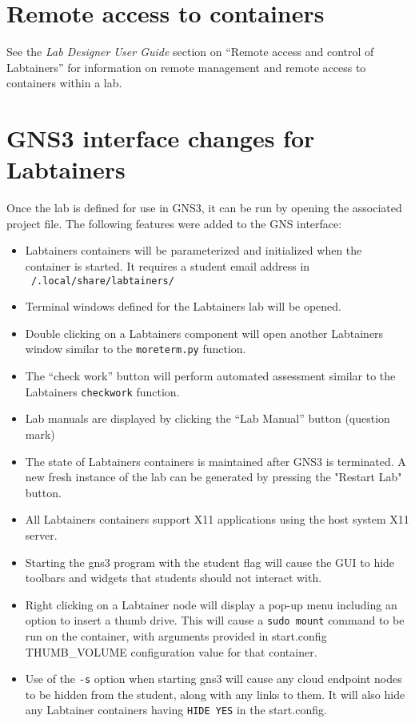 \documentclass[12pt]{article}
\begin{document}
\section{Remote access to containers}
See the \textit{Lab Designer User Guide} section on ``Remote access and control of Labtainers'' for information 
on remote management and remote access to containers within a lab.

\section{GNS3 interface changes for Labtainers}
Once the lab is defined for use in GNS3, it can be run by opening the associated project file.  The following features were added to the GNS interface:
\begin{itemize}
	\item Labtainers containers will be parameterized and initialized when the container is started.  It requires a student email address in
		{\tt ~/.local/share/labtainers/}
	\item Terminal windows defined for the Labtainers lab will be opened.
	\item Double clicking on a Labtainers component will open another Labtainers window similar to the {\tt moreterm.py} function.
	\item The ``check work'' button will perform automated assessment similar to the Labtainers {\tt checkwork} function.
	\item Lab manuals are displayed by clicking the ``Lab Manual'' button (question mark)
	\item The state of Labtainers containers is maintained after GNS3 is terminated.  A new fresh instance of the lab can be generated
		by pressing the "Restart Lab" button.
	\item All Labtainers containers support X11 applications using the host system X11 server.
	\item Starting the gns3 program with the \-\-student flag will cause the GUI to hide toolbars and widgets that students should not interact with.
        \item Right clicking on a Labtainer node will display a pop-up menu including an option to insert a thumb drive.  This will cause
              a {\tt sudo mount} command to be run on the container, with arguments provided in start.config THUMB\_VOLUME configuration
              value for that container.
        \item Use of the {\tt -s} option when starting gns3 will cause any cloud endpoint nodes to be hidden from the student,
along with any links to them.  It will also hide any Labtainer containers having {\tt HIDE YES} in the start.config.
\end{itemize}
\end{document}

